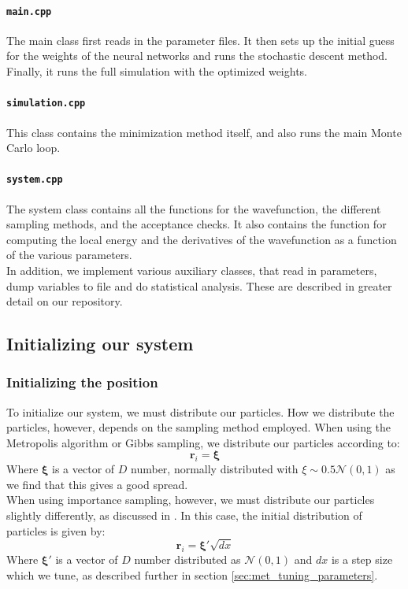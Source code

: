 \documentclass[a4paper, 10pt]{article}
\begin{document}
	\paragraph{\texttt{main.cpp}}
	The main class first reads in the parameter files. It then sets up the initial guess for the weights of the neural networks and runs the stochastic descent method. Finally, it runs the full simulation with the optimized weights.\\
	\paragraph{\texttt{simulation.cpp}}
	This class contains the minimization method itself, and also runs the main Monte Carlo loop.
	\paragraph{\texttt{system.cpp}}
	The system class contains all the functions for the wavefunction, the different sampling methods, and the acceptance checks. It also contains the function for computing the local energy and the derivatives of the wavefunction as a function of the various parameters.\\
	\linebreak
	In addition, we implement various auxiliary classes, that read in parameters, dump variables to file and do statistical analysis. These are described in greater detail on our repository.
	\subsection{Initializing our system}\label{sec:Initialization}
	\subsubsection{Initializing the position}
	To initialize our system, we must distribute our particles. How we distribute the particles, however, depends on the sampling method employed. When using the Metropolis algorithm or Gibbs sampling, we distribute our particles according to:
	\begin{equation}
	\boldsymbol{r}_i=\boldsymbol{\xi}
	\end{equation}
	Where $\boldsymbol{\xi}$ is a vector of $D$ number, normally distributed with $\xi \sim 0.5\mathcal{N}(0,1)$ as we find that this gives a good spread.\\
	\linebreak
	When using importance sampling, however, we must distribute our particles slightly differently, as discussed in \cite{Hjorth-Jensen2015}. In this case, the initial distribution of particles is given by:
	\begin{equation}
	\boldsymbol{r}_i=\boldsymbol{\xi'}\sqrt{dx}
	\end{equation}
	Where $\boldsymbol{\xi'}$ is a vector of $D$ number distributed as $\mathcal{N}(0,1)$ and $dx$ is a step size which we tune, as described further in section \ref{sec:met_tuning_parameters}.
\end{document}
